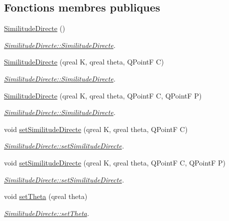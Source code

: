 \subsection*{Fonctions membres publiques}
\begin{DoxyCompactItemize}
\item 
\hypertarget{class_similitude_directe_a7ed5e906e0d9afa4eb5a50f26601b147}{}\hyperlink{class_similitude_directe_a7ed5e906e0d9afa4eb5a50f26601b147}{Similitude\+Directe} ()\label{class_similitude_directe_a7ed5e906e0d9afa4eb5a50f26601b147}

\begin{DoxyCompactList}\small\item\em \hyperlink{class_similitude_directe_a7ed5e906e0d9afa4eb5a50f26601b147}{Similitude\+Directe\+::\+Similitude\+Directe}. \end{DoxyCompactList}\item 
\hyperlink{class_similitude_directe_a64402a2d779eeedfd5f2ae86625daab5}{Similitude\+Directe} (qreal K, qreal theta, Q\+Point\+F C)
\begin{DoxyCompactList}\small\item\em \hyperlink{class_similitude_directe_a7ed5e906e0d9afa4eb5a50f26601b147}{Similitude\+Directe\+::\+Similitude\+Directe}. \end{DoxyCompactList}\item 
\hyperlink{class_similitude_directe_ad31aec6121a2508b176b32f816a7f5c3}{Similitude\+Directe} (qreal K, qreal theta, Q\+Point\+F C, Q\+Point\+F P)
\begin{DoxyCompactList}\small\item\em \hyperlink{class_similitude_directe_a7ed5e906e0d9afa4eb5a50f26601b147}{Similitude\+Directe\+::\+Similitude\+Directe}. \end{DoxyCompactList}\item 
void \hyperlink{class_similitude_directe_a2d8111830addbc8c5743d218b31ee627}{set\+Similitude\+Directe} (qreal K, qreal theta, Q\+Point\+F C)
\begin{DoxyCompactList}\small\item\em \hyperlink{class_similitude_directe_a2d8111830addbc8c5743d218b31ee627}{Similitude\+Directe\+::set\+Similitude\+Directe}. \end{DoxyCompactList}\item 
void \hyperlink{class_similitude_directe_a1ed9f92c74afc2fc51dfa149355dd3ef}{set\+Similitude\+Directe} (qreal K, qreal theta, Q\+Point\+F C, Q\+Point\+F P)
\begin{DoxyCompactList}\small\item\em \hyperlink{class_similitude_directe_a2d8111830addbc8c5743d218b31ee627}{Similitude\+Directe\+::set\+Similitude\+Directe}. \end{DoxyCompactList}\item 
void \hyperlink{class_similitude_directe_af64456a45860433f87d823a62fb2493d}{set\+Theta} (qreal theta)
\begin{DoxyCompactList}\small\item\em \hyperlink{class_similitude_directe_af64456a45860433f87d823a62fb2493d}{Similitude\+Directe\+::set\+Theta}. \end{DoxyCompactList}\end{DoxyCompactItemize}
